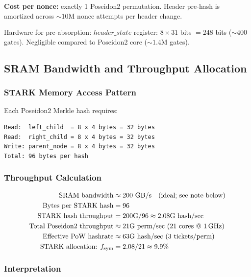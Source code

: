 \documentclass[11pt,a4paper]{article}
\begin{document}
\textbf{Cost per nonce:} exactly 1 Poseidon2 permutation. Header pre-hash is amortized across ${\sim}10$M nonce attempts per header change.

Hardware for pre-absorption: $\mathit{header\_state}$ register: $8 \times 31$ bits $= 248$ bits (${\sim}400$ gates). Negligible compared to Poseidon2 core (${\sim}1.4$M gates).

\subsection{SRAM Bandwidth and Throughput Allocation}
\label{sec:sram}

\subsubsection{STARK Memory Access Pattern}

Each Poseidon2 Merkle hash requires:
\begin{Verbatim}[fontsize=\small]
Read:  left_child  = 8 x 4 bytes = 32 bytes
Read:  right_child = 8 x 4 bytes = 32 bytes
Write: parent_node = 8 x 4 bytes = 32 bytes
Total: 96 bytes per hash
\end{Verbatim}

\subsubsection{Throughput Calculation}
\begin{align*}
\text{SRAM bandwidth} &\approx 200~\text{GB/s} \quad\text{(ideal; see note below)} \\
\text{Bytes per STARK hash} &= 96 \\
\text{STARK hash throughput} &= 200\text{G}/96 \approx 2.08\text{G hash/sec} \\
\text{Total Poseidon2 throughput} &\approx 21\text{G perm/sec (21 cores @ 1\,GHz)} \\
\text{Effective PoW hashrate} &\approx 63\text{G hash/sec (3 tickets/perm)} \\
\text{STARK allocation: } f_{\mathrm{sym}} &= 2.08/21 \approx 9.9\%
\end{align*}

\subsubsection{Interpretation}
\end{document}
